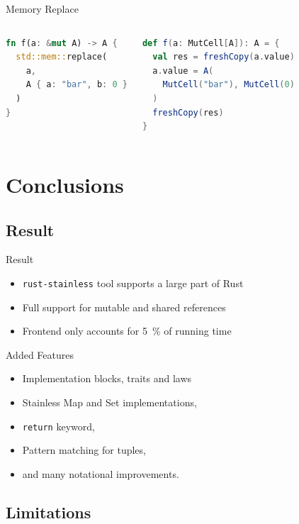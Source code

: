 \begin{frame}[fragile]{Memory Replace}
\begin{columns}[T]
\begin{lstlisting}[language=Rust]
fn f(a: &mut A) -> A {
  std::mem::replace(
    a,
    A { a: "bar", b: 0 }
  )
}
\end{lstlisting}
\begin{lstlisting}[language=Scala]
def f(a: MutCell[A]): A = {
  val res = freshCopy(a.value)
  a.value = A(
    MutCell("bar"), MutCell(0)
  )
  freshCopy(res)
}
\end{lstlisting}
\end{columns}
\end{frame}


\section{Conclusions}

\subsection{Result}

\begin{frame}{Result}
\begin{itemize}
  \item \texttt{rust-stainless} tool supports a large part of Rust
  \item Full support for mutable and shared references
  \item Frontend only accounts for 5~\% of running time
\end{itemize}
\end{frame}

\begin{frame}{Added Features}
\begin{itemize}
\item Implementation blocks, traits and laws
\item Stainless Map and Set implementations,
\item \lstinline!return! keyword,
\item Pattern matching for tuples,
\item and many notational improvements.
\end{itemize}
\end{frame}

\subsection{Limitations}

